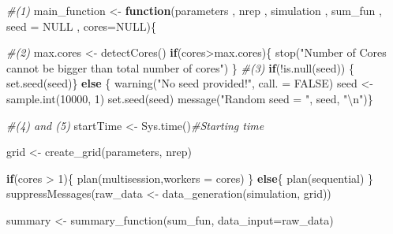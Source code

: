 \documentclass[11pt,a4paper]{article}
\newenvironment{Shaded}{\begin{snugshade}}{\end{snugshade}}
\newcommand{\AttributeTok}[1]{\textcolor[rgb]{0.77,0.63,0.00}{#1}}
\newcommand{\CommentTok}[1]{\textcolor[rgb]{0.56,0.35,0.01}{\textit{#1}}}
\newcommand{\ConstantTok}[1]{\textcolor[rgb]{0.00,0.00,0.00}{#1}}
\newcommand{\ControlFlowTok}[1]{\textcolor[rgb]{0.13,0.29,0.53}{\textbf{#1}}}
\newcommand{\DecValTok}[1]{\textcolor[rgb]{0.00,0.00,0.81}{#1}}
\newcommand{\FunctionTok}[1]{\textcolor[rgb]{0.00,0.00,0.00}{#1}}
\newcommand{\NormalTok}[1]{#1}
\newcommand{\OtherTok}[1]{\textcolor[rgb]{0.56,0.35,0.01}{#1}}
\newcommand{\SpecialCharTok}[1]{\textcolor[rgb]{0.00,0.00,0.00}{#1}}
\newcommand{\StringTok}[1]{\textcolor[rgb]{0.31,0.60,0.02}{#1}}
\begin{document}
\begin{Shaded}
\begin{Highlighting}[]
\CommentTok{\#(1)}
\NormalTok{main\_function }\OtherTok{\textless{}{-}}  \ControlFlowTok{function}\NormalTok{(parameters }
\NormalTok{                           , nrep }
\NormalTok{                           , simulation }
\NormalTok{                           , sum\_fun }
\NormalTok{                           , }\AttributeTok{seed =} \ConstantTok{NULL}
\NormalTok{                           , }\AttributeTok{cores=}\ConstantTok{NULL}\NormalTok{)\{}
 
    
  \CommentTok{\#(2)}
\NormalTok{  max.cores }\OtherTok{\textless{}{-}} \FunctionTok{detectCores}\NormalTok{()}
  \ControlFlowTok{if}\NormalTok{(cores}\SpecialCharTok{\textgreater{}}\NormalTok{max.cores)\{}
    \FunctionTok{stop}\NormalTok{(}\StringTok{"Number of Cores cannot be bigger than total number of cores"}\NormalTok{)}
\NormalTok{  \}}
  \CommentTok{\#(3)}
  \ControlFlowTok{if}\NormalTok{(}\SpecialCharTok{!}\FunctionTok{is.null}\NormalTok{(seed)) \{}
    \FunctionTok{set.seed}\NormalTok{(seed)\}}
  \ControlFlowTok{else}\NormalTok{ \{}
    \FunctionTok{warning}\NormalTok{(}\StringTok{"No seed provided!"}\NormalTok{, }\AttributeTok{call. =} \ConstantTok{FALSE}\NormalTok{)}
\NormalTok{    seed }\OtherTok{\textless{}{-}} \FunctionTok{sample.int}\NormalTok{(}\DecValTok{10000}\NormalTok{, }\DecValTok{1}\NormalTok{)}
    \FunctionTok{set.seed}\NormalTok{(seed)}
    \FunctionTok{message}\NormalTok{(}\StringTok{"Random seed = "}\NormalTok{, seed, }\StringTok{"}\SpecialCharTok{\textbackslash{}n}\StringTok{"}\NormalTok{)\} }
  
  \CommentTok{\#(4) and (5)}
\NormalTok{  startTime }\OtherTok{\textless{}{-}} \FunctionTok{Sys.time}\NormalTok{()}\CommentTok{\#Starting time }
  
  
  
\NormalTok{  grid }\OtherTok{\textless{}{-}} \FunctionTok{create\_grid}\NormalTok{(parameters, nrep) }
  
  \ControlFlowTok{if}\NormalTok{(cores }\SpecialCharTok{\textgreater{}} \DecValTok{1}\NormalTok{)\{}
    \FunctionTok{plan}\NormalTok{(multisession,}\AttributeTok{workers =}\NormalTok{ cores)}
\NormalTok{  \} }\ControlFlowTok{else}\NormalTok{\{}
    \FunctionTok{plan}\NormalTok{(sequential)}
\NormalTok{  \}}
  \FunctionTok{suppressMessages}\NormalTok{(raw\_data }\OtherTok{\textless{}{-}} \FunctionTok{data\_generation}\NormalTok{(simulation, grid))}
  
\NormalTok{  summary }\OtherTok{\textless{}{-}} \FunctionTok{summary\_function}\NormalTok{(sum\_fun, }\AttributeTok{data\_input=}\NormalTok{raw\_data) }
  

\end{Highlighting}
\end{Shaded}
\end{document}
